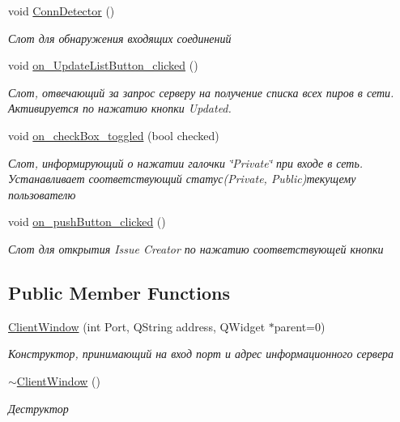 \begin{DoxyCompactItemize}
void \hyperlink{class_client_window_a1b54deb39018f95424f67e26c928db3f}{Conn\+Detector} ()
\begin{DoxyCompactList}\small\item\em Слот для обнаружения входящих соединений \end{DoxyCompactList}\item 
void \hyperlink{class_client_window_a03213f4bad0ff25e75eeb617b61d5bdf}{on\+\_\+\+Update\+List\+Button\+\_\+clicked} ()
\begin{DoxyCompactList}\small\item\em Слот, отвечающий за запрос серверу на получение списка всех пиров в сети. Активируется по нажатию кнопки Updated. \end{DoxyCompactList}\item 
void \hyperlink{class_client_window_a9d4b9f1e07bd287fcf7acbe62ab1efd3}{on\+\_\+check\+Box\+\_\+toggled} (bool checked)
\begin{DoxyCompactList}\small\item\em Слот, информирующий о нажатии галочки \char`\"{}\+Private\char`\"{} при входе в сеть. Устанавливает соответствующий статус(\+Private, Public)текущему пользователю \end{DoxyCompactList}\item 
void \hyperlink{class_client_window_ab8699235cbe5cc75a3180fdee7fb195c}{on\+\_\+push\+Button\+\_\+clicked} ()
\begin{DoxyCompactList}\small\item\em Слот для открытия Issue Creator по нажатию соответствующей кнопки \end{DoxyCompactList}\end{DoxyCompactItemize}
\subsection*{Public Member Functions}
\begin{DoxyCompactItemize}
\item 
\hyperlink{class_client_window_a23d2aaa14ef2a3587252a32bca6ce9c4}{Client\+Window} (int Port, Q\+String address, Q\+Widget $\ast$parent=0)
\begin{DoxyCompactList}\small\item\em Конструктор, принимающий на вход порт и адрес информационного сервера \end{DoxyCompactList}\item 
\hyperlink{class_client_window_af98431ebb79bc205a7da60ada28ddb91}{$\sim$\+Client\+Window} ()
\begin{DoxyCompactList}\small\item\em Деструктор \end{DoxyCompactList}\end{DoxyCompactItemize}

